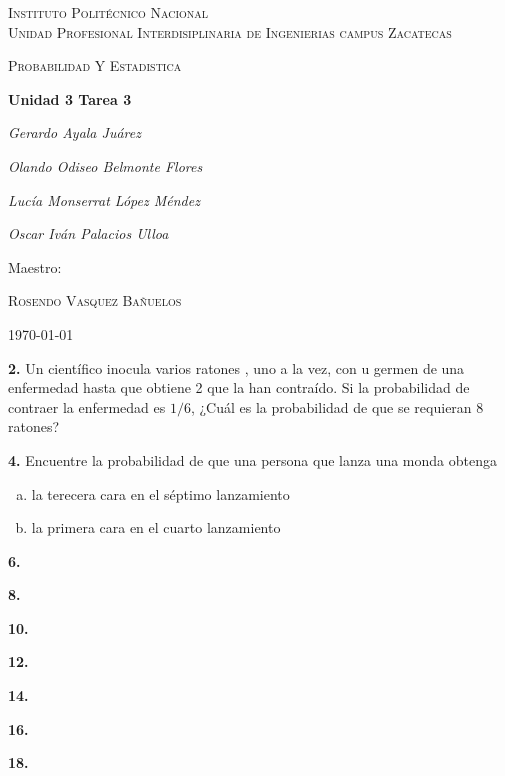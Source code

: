 \documentclass[12pt, letterpaper]{article}
\begin{document}
    \begin{titlepage}
        \centering
        {\scshape\LARGE Instituto Politécnico Nacional\\ Unidad Profesional Interdisiplinaria de Ingenierias campus Zacatecas\par}
        \vspace{1cm}
        {\scshape\Large Probabilidad Y Estadistica\par}
        \vspace{1.5cm}
        {\huge\bfseries Unidad 3 Tarea 3\par}
        \vspace{2cm}
        {\Large\itshape Gerardo Ayala Juárez\par}
        {\Large\itshape Olando Odiseo Belmonte Flores\par}
        {\Large\itshape Lucía Monserrat López Méndez\par}
        {\Large\itshape Oscar Iván Palacios Ulloa\par}
        \vfill
        Maestro:\par
        \textsc{
        Rosendo Vasquez Bañuelos}
        \vfill
        {\large \today \par}
    \end{titlepage}

    \textbf{2. }Un científico inocula varios ratones , uno a la vez, con u germen de una enfermedad hasta que obtiene 2
    que la han contraído. Si la probabilidad  de contraer la enfermedad es $1/6$, ¿Cuál es la probabilidad de que se
    requieran 8 ratones?\vskip1cm

    \textbf{4. }Encuentre la probabilidad  de que una persona que lanza una monda obtenga\\
    \begin{enumerate}[a)]
        \item la terecera cara en el séptimo lanzamiento
        \item la primera cara en el cuarto lanzamiento
    \end{enumerate}\vskip1cm

    \textbf{6. }\vskip1cm

    \textbf{8. }\vskip1cm

    \textbf{10. }\vskip1cm

    \textbf{12. }\vskip1cm

    \textbf{14. }\vskip1cm

    \textbf{16. }\vskip1cm

    \textbf{18. }\vskip1cm
\end{document}
